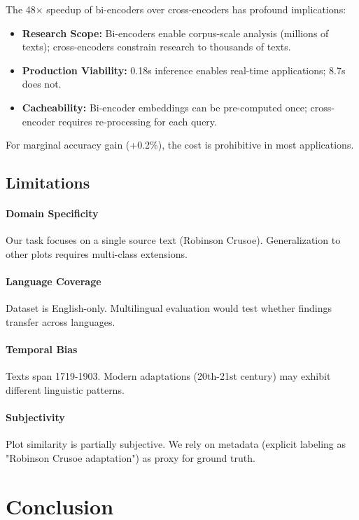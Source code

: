\documentclass[11pt,a4paper]{article}
\begin{document}
The 48× speedup of bi-encoders over cross-encoders has profound implications:

\begin{itemize}
    \item \textbf{Research Scope:} Bi-encoders enable corpus-scale analysis (millions of texts); cross-encoders constrain research to thousands of texts.
    \item \textbf{Production Viability:} 0.18s inference enables real-time applications; 8.7s does not.
    \item \textbf{Cacheability:} Bi-encoder embeddings can be pre-computed once; cross-encoder requires re-processing for each query.
\end{itemize}

For marginal accuracy gain (+0.2\%), the cost is prohibitive in most applications.

\subsection{Limitations}

\paragraph{Domain Specificity} Our task focuses on a single source text (Robinson Crusoe). Generalization to other plots requires multi-class extensions.

\paragraph{Language Coverage} Dataset is English-only. Multilingual evaluation would test whether findings transfer across languages.

\paragraph{Temporal Bias} Texts span 1719-1903. Modern adaptations (20th-21st century) may exhibit different linguistic patterns.

\paragraph{Subjectivity} Plot similarity is partially subjective. We rely on metadata (explicit labeling as "Robinson Crusoe adaptation") as proxy for ground truth.

\section{Conclusion}
\end{document}
